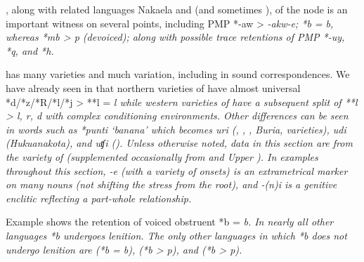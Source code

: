 ,
along with related languages Naka{\Q}ela
and  (and sometimes ),
of the  node is an important witness on
several points, including PMP *-aw > \it{-akw-e}; *b = \it{b},
whereas *mb > \it{p} (devoiced); along with possible trace retentions
of PMP *-uy, *q, and *h.

 has many varieties
and much variation, including in sound correspondences.
We have already seen in  that northern varieties of
 have almost universal *d/*z/*R/*l/*j > **l = \it{l} while
western varieties of  have a subsequent split of **l > \it{l,
r, d} with complex conditioning environments.
Other differences can be seen in words such as *punti ‘banana’
which becomes \it{uri} (,
, , Buria,  varieties), \it{udi} (Hukuanakota), and \it{uʧi} ().
Unless otherwise noted, data in this section are from the 
variety of  (supplemented occasionally from  and Upper ).
In examples throughout this section,
\it{-e} (with a variety of onsets) is an extrametrical marker
on many nouns  (not shifting the stress from the root),
and \it{-(n)i} is a genitive enclitic reflecting a part-whole relationship.

Example  shows the retention of voiced obstruent *b = \it{b}.
In nearly all other  languages *b undergoes lenition.
The only other languages in which *b does not undergo lenition
are  (*b = \it{b}),
 (*b > \it{p}),
and  (*b > \it{p}).

